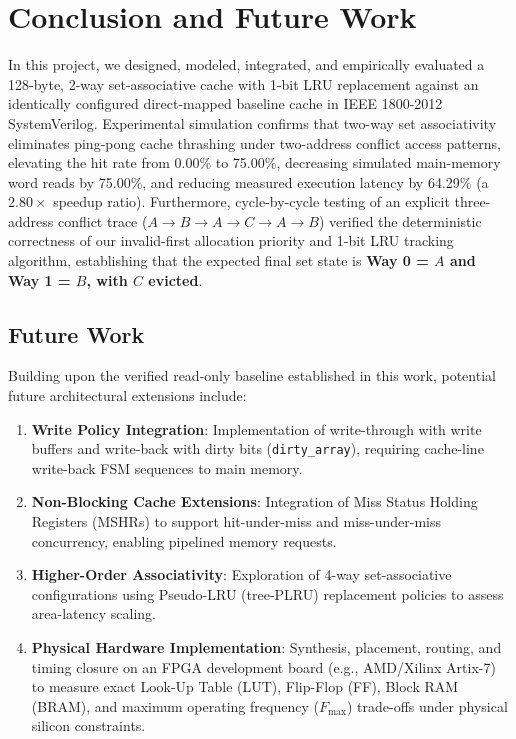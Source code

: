 \documentclass[conference]{IEEEtran}
\begin{document}
\section{Conclusion and Future Work}
\label{sec:conclusion}

In this project, we designed, modeled, integrated, and empirically evaluated a 128-byte, 2-way set-associative cache with 1-bit LRU replacement against an identically configured direct-mapped baseline cache in IEEE 1800-2012 SystemVerilog. Experimental simulation confirms that two-way set associativity eliminates ping-pong cache thrashing under two-address conflict access patterns, elevating the hit rate from 0.00\% to 75.00\%, decreasing simulated main-memory word reads by 75.00\%, and reducing measured execution latency by 64.29\% (a $2.80\times$ speedup ratio). Furthermore, cycle-by-cycle testing of an explicit three-address conflict trace ($A \to B \to A \to C \to A \to B$) verified the deterministic correctness of our invalid-first allocation priority and 1-bit LRU tracking algorithm, establishing that the expected final set state is \textbf{Way 0 = $A$ and Way 1 = $B$, with $C$ evicted}.

\subsection{Future Work}
Building upon the verified read-only baseline established in this work, potential future architectural extensions include:
\begin{enumerate}
    \item \textbf{Write Policy Integration}: Implementation of write-through with write buffers and write-back with dirty bits (\texttt{dirty\_array}), requiring cache-line write-back FSM sequences to main memory.
    \item \textbf{Non-Blocking Cache Extensions}: Integration of Miss Status Holding Registers (MSHRs) to support hit-under-miss and miss-under-miss concurrency, enabling pipelined memory requests.
    \item \textbf{Higher-Order Associativity}: Exploration of 4-way set-associative configurations using Pseudo-LRU (tree-PLRU) replacement policies to assess area-latency scaling.
    \item \textbf{Physical Hardware Implementation}: Synthesis, placement, routing, and timing closure on an FPGA development board (e.g., AMD/Xilinx Artix-7) to measure exact Look-Up Table (LUT), Flip-Flop (FF), Block RAM (BRAM), and maximum operating frequency ($F_{\max}$) trade-offs under physical silicon constraints.
\end{enumerate}



\end{document}
